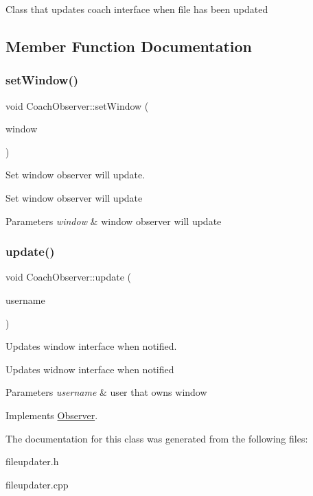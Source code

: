 Class that updates coach interface when file has been updated 

\subsection{Member Function Documentation}
\mbox{\label{classCoachObserver_ae0416592b3625c117074fad59c49eacc}} 
\subsubsection{\texorpdfstring{setWindow()}{setWindow()}}
{\footnotesize\ttfamily void Coach\+Observer\+::set\+Window (\begin{DoxyParamCaption}\item[{\mbox{\hyperlink{classCoachWindow}{Coach\+Window}} $\ast$}]{window }\end{DoxyParamCaption})}



Set window observer will update. 

Set window observer will update 
\begin{DoxyParams}{Parameters}
{\em window} & window observer will update \\
\hline
\end{DoxyParams}
\mbox{\label{classCoachObserver_a374f9d569656139d5dd6cebe73fd4169}} 
\subsubsection{\texorpdfstring{update()}{update()}}
{\footnotesize\ttfamily void Coach\+Observer\+::update (\begin{DoxyParamCaption}\item[{std\+::string}]{username }\end{DoxyParamCaption})\hspace{0.3cm}{\ttfamily [virtual]}}



Updates window interface when notified. 

Updates widnow interface when notified 
\begin{DoxyParams}{Parameters}
{\em username} & user that owns window \\
\hline
\end{DoxyParams}


Implements \mbox{\hyperlink{classObserver_a8de6a6c3270b66dfe4cf5a172705a4b1}{Observer}}.



The documentation for this class was generated from the following files\+:\begin{DoxyCompactItemize}
\item 
fileupdater.\+h\item 
fileupdater.\+cpp\end{DoxyCompactItemize}
